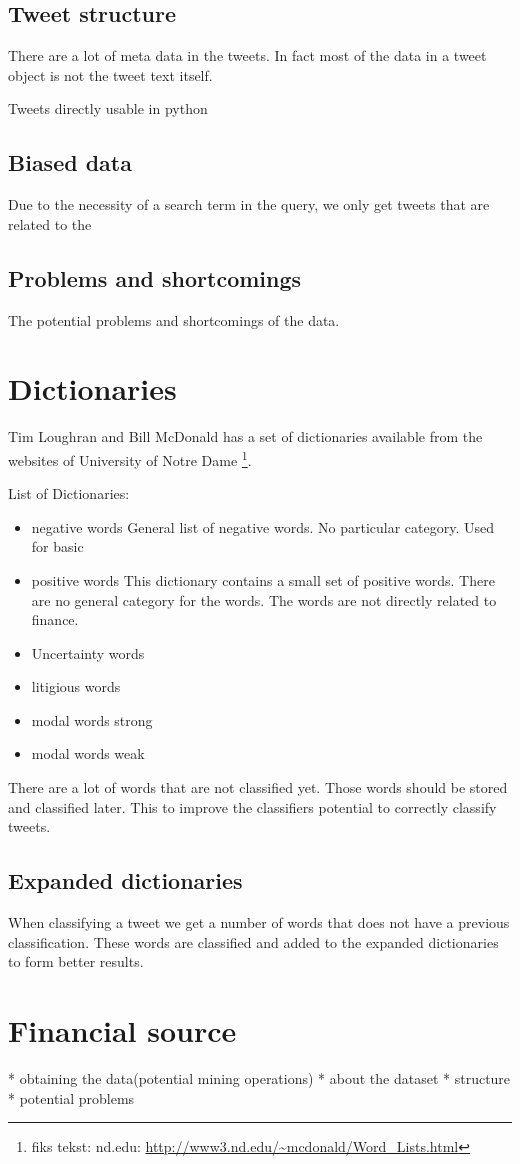 \subsection{Tweet structure}
There are a lot of meta data in the tweets. In fact most of the data in a tweet
object is not the tweet text itself.  

Tweets directly usable in python 

\subsection{Biased data}
Due to the necessity of a search term in the query, we only get tweets that are
related to the 

\subsection{Problems and shortcomings}
The potential problems and shortcomings of the data. 

\section{Dictionaries}\label{sec:dict}

Tim Loughran and Bill McDonald has a set of dictionaries available from the
websites of University of Notre Dame \footnote{fiks tekst: nd.edu:
\url{http://www3.nd.edu/~mcdonald/Word_Lists.html}}. 

List of Dictionaries:
\begin{itemize}
    \item negative words
General list of negative words. No particular category. Used for basic   
    \item positive words
This dictionary contains a small set of positive words. There are no general
category for the words. The words are not directly related to finance. 
    \item Uncertainty words
    \item litigious words
    \item modal words strong
    \item modal words weak
\end{itemize}

There are a lot of words that are not classified yet. Those words should be
stored and classified later. This to improve the classifiers potential to
correctly classify tweets.  

\subsection{Expanded dictionaries}
When classifying a tweet we get a number of words that does not have a previous
classification. These words are classified and added to the expanded
dictionaries to form better results. 


\section{Financial source}
* obtaining the data(potential mining operations)
* about the dataset  
* structure
* potential problems 
